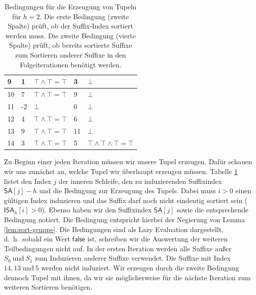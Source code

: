 \begin{table}[]
\begin{tabular}{|l|l|l|l|l|}
9   & 1               & $\top \wedge \top = \top$   & 3            & $\bot$                                                                                                                            \\ \hline
10  & 7               & $\top \wedge \top = \top$   & 9            & $\bot$                                                                                                                            \\ \hline
11  & -2              & $\bot$                      & 0            & $\bot$                                                                                                                            \\ \hline
12  & 4               & $\top \wedge \top = \top$   & 6            & $\bot$                                                                                                                            \\ \hline
13  & 9               & $\top \wedge \top = \top$   & 11           & $\bot$                                                                                                                            \\ \hline
14  & 3               & $\top \wedge \top = \top$   & 5            & $\top \wedge \top \wedge \top = \top$                                                                                             \\ \hline
\end{tabular}
\caption{Bedingungen für die Erzeugung von Tupeln für $h=2$. Die erste Bedingung (zweite Spalte) prüft, ob der Suffix-Index sortiert werden muss. Die zweite Bedingung (vierte Spalte) prüft, ob bereits sortierte Suffixe zum Sortieren anderer Suffixe in den Folgeiterationen benötigt werden.}
\label{tab:osipov-tupel-cond}
\end{table}

Zu Beginn einer jeden Iteration müssen wir unsere Tupel erzeugen. Dafür schauen wir uns zunächst an, welche Tupel wir überhaupt erzeugen müssen. Tabelle \ref{tab:osipov-tupel-cond} listet den Index $j$ der inneren Schleife, den zu induzierenden Suffixindex $\mathsf{SA}[j]-h$ und die Bedingung zur Erzeugung des Tupels. Dabei muss $i>0$ einen gültigen Index induzieren und das Suffix darf noch nicht eindeutig sortiert sein ($\mathsf{ISA}_h[i] > 0$). Ebenso haben wir den Suffixindex $\mathsf{SA}[j]$ sowie die entsprechende Bedingung notiert. Die Bedingung entspricht hierbei der Negierung von Lemma \ref{lem:sort-gruppe}. Die Bedingungen sind als Lazy Evaluation dargestellt, d.~h.\ sobald ein Wert $\mathsf{false}$ ist, schreiben wir die Auswertung der weiteren Teilbedingungen nicht auf. In der ersten Iteration werden alle Suffixe außer $S_0 ~\text{und}~ S_1$ zum Induzieren anderer Suffixe verwendet. Die Suffixe mit Index $14, 13 ~\text{und}~ 5$ werden nicht induziert. Wir erzeugen durch die zweite Bedingung dennoch Tupel mit ihnen, da wir sie möglicherweise für die nächste Iteration zum weiteren Sortieren benötigen.

